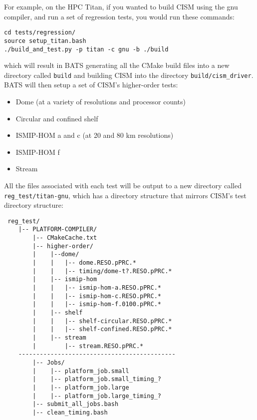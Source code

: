 \par
For example, on the HPC Titan, if you wanted to build CISM using the gnu compiler, and run a set of regression tests,
you would run these commands: 

\begin{verbatim}
cd tests/regression/
source setup_titan.bash
./build_and_test.py -p titan -c gnu -b ./build
\end{verbatim}

\noindent
which will result in BATS generating all the CMake build files into a new directory called \texttt{build} and building
CISM into the directory \texttt{build/cism\_driver}. BATS will then setup a set of CISM's higher-order tests:

\begin{itemize}
    \item Dome (at a variety of resolutions and processor counts) \\
    \item Circular and confined shelf \\
    \item ISMIP-HOM a and c (at 20 and 80 km resolutions) \\
    \item ISMIP-HOM f \\
    \item Stream \\
\end{itemize}

\par
All the files associated with each test will be output to a new directory called \texttt{reg\_test/titan-gnu}, which has a
directory structure that mirrors CISM's test directory structure:

\begin{verbatim}
 reg_test/
    |-- PLATFORM-COMPILER/
        |-- CMakeCache.txt
        |-- higher-order/
        |    |--dome/
        |    |   |-- dome.RESO.pPRC.*
        |    |   |-- timing/dome-t?.RESO.pPRC.*
        |    |-- ismip-hom
        |    |   |-- ismip-hom-a.RESO.pPRC.*
        |    |   |-- ismip-hom-c.RESO.pPRC.*
        |    |   |-- ismip-hom-f.0100.pPRC.*
        |    |-- shelf
        |    |   |-- shelf-circular.RESO.pPRC.*
        |    |   |-- shelf-confined.RESO.pPRC.*
        |    |-- stream
        |        |-- stream.RESO.pPRC.*
    --------------------------------------------
        |-- Jobs/
        |    |-- platform_job.small
        |    |-- platform_job.small_timing_?
        |    |-- platform_job.large
        |    |-- platform_job.large_timing_?
        |-- submit_all_jobs.bash
        |-- clean_timing.bash
\end{verbatim}

